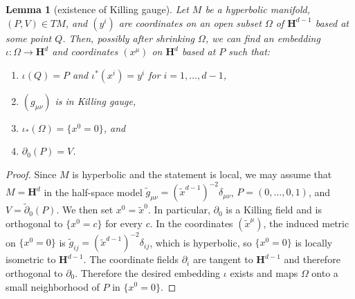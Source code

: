 \documentclass[reqno,12pt,letterpaper]{amsart}
\newcommand{\Hyp}{\mathbf H}
\newtheorem{lemma}[theorem]{Lemma}
\theoremstyle{definition}
\numberwithin{equation}{section}
\begin{document}
\begin{lemma}[existence of Killing gauge]\label{existence of Killing gauge}
Let $M$ be a hyperbolic manifold, $(P, V) \in TM$, and $(y^i)$ are coordinates on an open subset $\Omega$ of $\Hyp^{d - 1}$ based at some point $Q$.
Then, possibly after shrinking $\Omega$, we can find an embedding $\iota: \Omega \to \Hyp^d$ and coordinates $(x^\mu)$ on $\Hyp^d$ based at $P$ such that:
\begin{enumerate}
\item $\iota(Q) = P$ and $\iota^* (x^i) = y^i$ for $i = 1, \dots, d - 1$,
\item $(g_{\mu\nu})$ is in Killing gauge,
\item $\iota_* (\Omega) = \{x^0 = 0\}$, and 
\item $\partial_0(P) = V$.
\end{enumerate}
\end{lemma}
\begin{proof}
Since $M$ is hyperbolic and the statement is local, we may assume that $M = \Hyp^d$ in the half-space model $\tilde g_{\mu\nu} = (\tilde x^{d - 1})^{-2} \delta_{\mu\nu}$, $P = (0, \dots, 0, 1)$, and $V = \tilde \partial_0(P)$.
We then set $x^0 = \tilde x^0$.
In particular, $\partial_0$ is a Killing field and is orthogonal to $\{x^0 = c\}$ for every $c$.
In the coordinates $(\tilde x^\mu)$, the induced metric on $\{x^0 = 0\}$ is $\tilde g_{ij} = (\tilde x^{d - 1})^{-2} \delta_{ij}$, which is hyperbolic, so $\{x^0 = 0\}$ is locally isometric to $\Hyp^{d - 1}$.
The coordinate fields $\partial_i$ are tangent to $\Hyp^{d - 1}$ and therefore orthogonal to $\partial_0$.
Therefore the desired embedding $\iota$ exists and maps $\Omega$ onto a small neighborhood of $P$ in $\{x^0 = 0\}$.
\end{proof}
\end{document}
